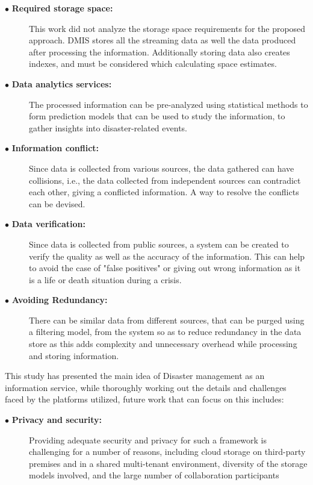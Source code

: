 \begin{description}
	\item[$\bullet$ \textbf{Required storage space:}]
	\hfill\break
	This work did not analyze the storage space requirements for the proposed approach. DMIS stores all the streaming data as well the data produced after processing the information. Additionally storing data also creates indexes, and must be considered which calculating space estimates.

	\item[$\bullet$ \textbf{Data analytics services:}]
	\hfill\break
	The processed information can be pre-analyzed using statistical methods to form prediction models that can be used to study the information, to gather insights into disaster-related events.
	
	\item[$\bullet$ \textbf{Information conflict:}]
	\hfill\break
	Since data is collected from various sources, the data gathered can have collisions, i.e., the data collected from independent sources can contradict each other, giving a conflicted information. A way to resolve the conflicts can be devised. 
	
	\item[$\bullet$ \textbf{Data verification:}]
	\hfill\break
	Since data is collected from public sources, a system can be created to verify the quality as well as the accuracy of the information. This can help to avoid the case of "false positives" or giving out wrong information as it is a life or death situation during a crisis.

	\item[$\bullet$ \textbf{Avoiding Redundancy:}]
	\hfill\break
	There can be similar data from different sources, that can be purged using a filtering model, from the system so as to reduce redundancy in the data store as this adds complexity and unnecessary overhead while processing and storing information.
\end{description}

This study has presented the main idea of Disaster management as an information service, while thoroughly working out the details and challenges faced by the platforms utilized, future work that can focus on this includes:

\begin{description}
	\item[$\bullet$ \textbf{Privacy and security:}]
	\hfill\break
	Providing adequate security and privacy for such a framework is challenging for a number of reasons, including cloud storage on third-party premises and in a shared multi-tenant environment, diversity of the storage models involved, and the large number of collaboration participants
\end{description}

